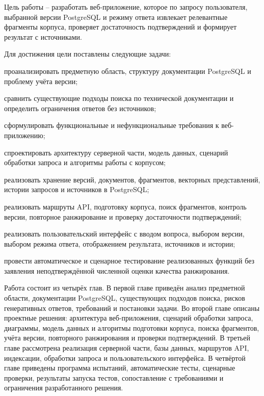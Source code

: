 Цель работы -- разработать веб-приложение, которое по запросу пользователя, выбранной версии PostgreSQL и режиму ответа извлекает релевантные фрагменты корпуса, проверяет достаточность подтверждений и формирует результат с источниками.

Для достижения цели поставлены следующие задачи:
\begin{compactlist}
  \item проанализировать предметную область, структуру документации PostgreSQL и проблему учёта версии;
  \item сравнить существующие подходы поиска по технической документации и определить ограничения ответов без источников;
  \item сформулировать функциональные и нефункциональные требования к веб-приложению;
  \item спроектировать архитектуру серверной части, модель данных, сценарий обработки запроса и алгоритмы работы с корпусом;
  \item реализовать хранение версий, документов, фрагментов, векторных представлений, истории запросов и источников в PostgreSQL;
  \item реализовать маршруты API, подготовку корпуса, поиск фрагментов, контроль версии, повторное ранжирование и проверку достаточности подтверждений;
  \item реализовать пользовательский интерфейс с вводом вопроса, выбором версии, выбором режима ответа, отображением результата, источников и истории;
  \item провести автоматическое и сценарное тестирование реализованных функций без заявления неподтверждённой численной оценки качества ранжирования.
\end{compactlist}

Работа состоит из четырёх глав. В первой главе приведён анализ предметной области, документации PostgreSQL, существующих подходов поиска, рисков генеративных ответов, требований и постановки задачи. Во второй главе описаны проектные решения: архитектура веб-приложения, сценарий обработки запроса, диаграммы, модель данных и алгоритмы подготовки корпуса, поиска фрагментов, учёта версии, повторного ранжирования и проверки подтверждений. В третьей главе рассмотрена реализация серверной части, базы данных, маршрутов API, индексации, обработки запроса и пользовательского интерфейса. В четвёртой главе приведены программа испытаний, автоматические тесты, сценарные проверки, результаты запуска тестов, сопоставление с требованиями и ограничения разработанного решения.

